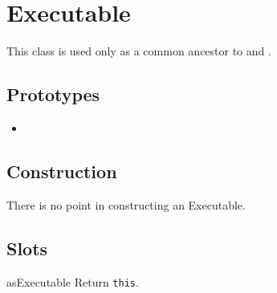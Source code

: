 \section{Executable}

This class is used only as a common ancestor to 
and .

\subsection{Prototypes}
\begin{itemize}
\item {}
\end{itemize}

\subsection{Construction}

There is no point in constructing an Executable.

\subsection{Slots}

\begin{urbiscriptapi}
\item[asExecutable] Return \lstinline|this|.
\end{urbiscriptapi}



